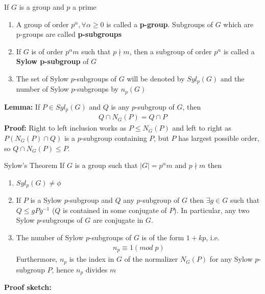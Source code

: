 \documentclass[titlepage, 12pt]{article}
\begin{document}
\begin{definition}{}{}
    If $G$ is a group and $p$ a prime
    \begin{enumerate}
        \item A group of order $p^\alpha,\forall\alpha\geq 0$ is called a
            \textbf{p-group}. Subgroups of $G$ which are p-groups are called
            \textbf{p-subgroups}
        \item If $G$ is of order $p^\alpha m$ such that $p\nmid m$, then a
            subgroup of order $p^\alpha$ is called a \textbf{Sylow p-subgroup}
            of $G$
        \item The set of Sylow $p$-subgroups of $G$ will be denoted by
            $Syl_p(G)$ and the number of Sylow $p$-subgroups by $n_p(G)$
    \end{enumerate}
\end{definition}

\textbf{Lemma:} If $P\in Syl_p(G)$ and $Q$ is any $p$-subgroup of $G$, then
\begin{gather*}
Q\cap N_G(P) = Q\cap P
\end{gather*}
\textbf{Proof:} Right to left inclusion works as $P\leq N_G(P)$ and left to
right as $P(N_G(P)\cap Q)$ is a $p$-subgroup containing $P$, but $P$ has largest
possible order, so $Q\cap N_G(P)\leq P$.

\begin{theorem}{Sylow's Theorem}{}
    If $G$ is a group such that $|G| = p^\alpha m$ and $p\nmid m$ then
    \begin{enumerate}
        \item $Syl_p(G)\neq\phi$
        \item If $P$ is a Sylow $p$-subgroup and $Q$ any $p$-subgroup of $G$
            then $\exists g\in G$ such that $Q\leq gPg^{-1}$ ($Q$ is contained
            in some conjugate of $P$). In particular, any two Sylow
            $p$-subgroups of $G$ are conjugate in $G$.
        \item The number of Sylow $p$-subgroups of $G$ is of the form $1+kp$,
            i.e.
            \begin{gather*}
                n_p\equiv 1(mod\; p)
            \end{gather*}
            Furthermore, $n_p$ is the index in $G$ of the normalizer $N_G(P)$
            for any Sylow $p$-subgroup $P$, hence $n_p$ divides $m$
    \end{enumerate}
\end{theorem}
\textbf{Proof sketch:}
\end{document}
